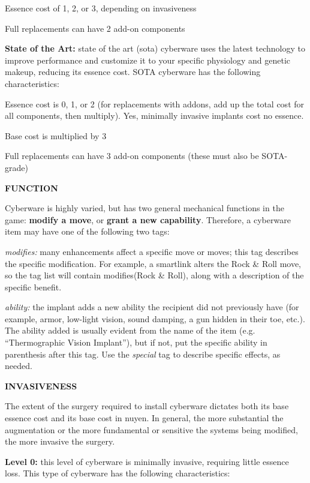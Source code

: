 \documentclass[oneside,10pt]{article}
\begin{document}
\begin{multicols}{2}
\begin{dent}
\tcirc{} Essence cost of 1, 2, or 3, depending on invasiveness

\tcirc{} Full replacements can have 2 add-on components
\end{dent}
\textbf{State of the Art:} state of the art (sota) cyberware uses the
latest technology to improve performance and customize
it to your specific physiology and genetic makeup, reducing its essence cost. SOTA cyberware has the following
characteristics:
\begin{dent}

\tcirc{} Essence cost is 0, 1, or 2 (for replacements with addons, add up the total cost for all components, then multiply). Yes, minimally invasive implants cost no essence.

\tcirc{} Base cost is multiplied by 3

\tcirc{} Full replacements can have 3 add-on components (these
must also be SOTA-grade)
\end{dent}
\textbf{\large FUNCTION}

Cyberware is highly varied, but has two general mechanical
functions in the game: \textbf{modify a move}, or \textbf{grant a new capability}. Therefore, a cyberware item may have one of the
following two tags:
\begin{dent}

\textit{modifies:} many enhancements affect a specific move or
moves; this tag describes the specific modification. For example, a smartlink alters the Rock \& Roll move, so the
tag list will contain modifies(Rock \& Roll), along with a
description of the specific benefit.

\textit{ability:} the implant adds a new ability the recipient did
not previously have (for example, armor, low-light vision,
sound damping, a gun hidden in their toe, etc.). The ability
added is usually evident from the name of the item (e.g.
``Thermographic Vision Implant''), but if not, put the specific ability in parenthesis after this tag. Use the \textit{special} tag to
describe specific effects, as needed.
\end{dent}

\textbf{\large INVASIVENESS}

The extent of the surgery required to install cyberware dictates both its base essence cost and its base cost in nuyen. In
general, the more substantial the augmentation or the more
fundamental or sensitive the systems being modified, the
more invasive the surgery.

\textbf{Level 0:} this level of cyberware is minimally invasive, requiring little essence loss. This type of cyberware has the following characteristics:
\begin{dent}


\end{dent}
\end{multicols}
\end{document}
